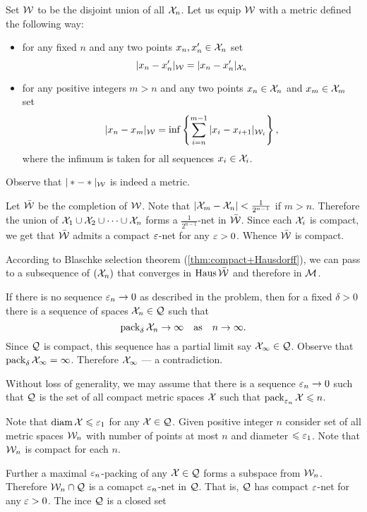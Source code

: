 Set $\mathcal{W}$ to be the disjoint union of all $\mathcal{X}_n$.
Let us equip $\mathcal{W}$ with a metric defined the following way:
\begin{itemize}
\item for any fixed $n$ and any two points $x_n,x_n'\in \mathcal{X}_n$ set
$$|x_n-x_n'|_{\mathcal{W}}=|x_n-x_n'|_{\mathcal{X}_n}$$
\item for any positive integers $m>n$ and any two points $x_n\in \mathcal{X}_n$ and $x_m\in \mathcal{X}_m$ set
$$|x_n-x_m|_{\mathcal{W}}=\inf\left\{\sum_{i=n}^{m-1}|x_i-x_{i+1}|_{\mathcal{W}_i}\right\},$$
where the infimum is taken for all sequences $x_i\in \mathcal{X}_i$.
\end{itemize}
Observe that $|*-*|_{\mathcal{W}}$ is indeed a metric.


Let $\bar{\mathcal{W}}$ be the completion of $\mathcal{W}$.
Note that $|\mathcal{X}_m-\mathcal{X}_n|<\tfrac1{2^{n-1}}$ if $m>n$.
Therefore the union of $\mathcal{X}_1\cup \mathcal{X}_2\cup\dots\cup \mathcal{X}_n$ forms a $\tfrac1{2^{n-1}}$-net in $\bar{\mathcal{W}}$.
Since each $\mathcal{X}_i$ is compact, we get that $\bar{\mathcal{W}}$ admits a compact $\varepsilon$-net for any $\varepsilon>0$.
Whence $\bar{\mathcal{W}}$ is compact.

According to Blaschke selection theorem (\ref{thm:compact+Hausdorff}),
we can pass to a subsequence of $(\mathcal{X}_n)$ that converges in $\operatorname{\rm Haus}\nolimits\bar{\mathcal{W}}$ and therefore in $\mathcal{M}$.
\qeds

If there is no sequence $\varepsilon_n\to0$ as described in the problem, then for a fixed $\delta>0$
there is a sequence of spaces $\mathcal{X}_n\in\mathcal{Q}$ such that $$\operatorname{\rm pack}\nolimits_\delta \mathcal{X}_n\to\infty
\quad\text{as}\quad
n\to\infty.$$
Since $\mathcal{Q}$ is compact, 
this sequence has a partial limit say $\mathcal{X}_\infty\in\mathcal{Q}$.
Observe that $\operatorname{\rm pack}\nolimits_{\delta} \mathcal{X}_\infty=\infty$.
Therefore $\mathcal{X}_\infty$ --- a contradiction.

Without loss of generality, we may assume that there is a sequence $\varepsilon_n\to 0$ such that 
$\mathcal{Q}$ is the set of all compact metric spaces $\mathcal{X}$ such that
$\operatorname{\rm pack}\nolimits_{\varepsilon_n} \mathcal{X}\leqslant n$.

Note that $\operatorname{\rm diam}\nolimits \mathcal{X}\leqslant \varepsilon_1$ for any $\mathcal{X}\in \mathcal{Q}$.
Given positive integer $n$ consider set of all metric spaces $\mathcal{W}_n$
with number of points at most $n$ and diameter $\leqslant \varepsilon_1$.
Note that $\mathcal{W}_n$ is compact for each $n$.

Further a maximal $\varepsilon_n$-packing of any $\mathcal{X}\in\mathcal{Q}$ forms a subspace from $\mathcal{W}_n$.
Therefore $\mathcal{W}_n\cap\mathcal{Q}$ is a comapct $\varepsilon_n$-net in  $\mathcal{Q}$.
That is, $\mathcal{Q}$ has compact $\varepsilon$-net for any $\varepsilon>0$.
The ince $\mathcal{Q}$ is a closed set 
\qeds

